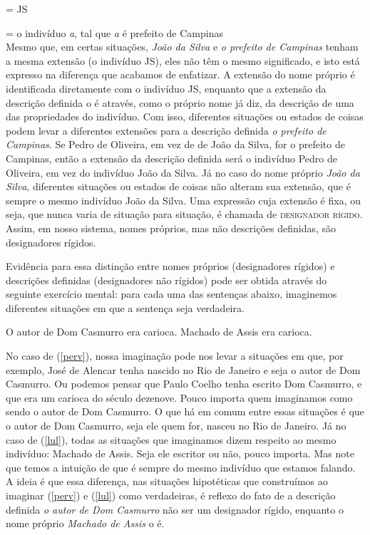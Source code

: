 \n {} = JS

\n {} = o indivíduo \textit{a}, tal
que \textit{a} é prefeito de Campinas\\

\n Mesmo que, em certas situações, \textit{João da Silva} e \textit{o prefeito de Campinas} tenham a mesma extensão (o indivíduo JS), eles não têm o
mesmo significado, e isto está expresso na diferença que acabamos
de enfatizar. A extensão do nome próprio é identificada
diretamente com o indivíduo JS, enquanto que a extensão da
descrição definida o é através, como o próprio nome já diz, da
descrição de uma das propriedades do indivíduo. Com isso,
diferentes situações ou estados de coisas podem levar a diferentes
extensões para a descrição definida \textit{o prefeito de Campinas}. Se
Pedro de Oliveira, em vez de de João da Silva, for o prefeito de
Campinas, então a extensão da descrição definida será o indivíduo
Pedro de Oliveira, em vez do indivíduo João da Silva. Já no caso
do nome próprio \textit{João da Silva}, diferentes situações ou estados
de coisas não alteram sua extensão, que é sempre o mesmo indivíduo
João da Silva. Uma expressão cuja extensão é fixa, ou seja, que
nunca varia de situação para situação, é chamada de
\textsc{designador rígido}. Assim, em nosso sistema, nomes
próprios, mas não descrições definidas, são designadores rígidos.

Evidência para essa distinção entre nomes próprios
(designadores rígidos) e descrições definidas
(designadores não rígidos) pode ser obtida através do
seguinte exercício mental: para cada uma das sentenças abaixo,
imaginemos diferentes situações em que a sentença seja verdadeira.

\begin{exe}
\ex O autor de Dom Casmurro era carioca.\label{perv}
\ex Machado de Assis era carioca.\label{lul}
\end{exe}

No caso de (\ref{perv}), nossa imaginação pode nos levar a
situações em que, por exemplo, José de Alencar tenha nascido no
Rio de Janeiro e seja o autor de Dom Casmurro. Ou podemos pensar
que Paulo Coelho tenha escrito Dom Casmurro, e que era um carioca
do século dezenove. Pouco importa quem imaginamos como sendo o
autor de Dom Casmurro. O que há em comum entre essas situações é
que o autor de Dom Casmurro, seja ele quem for, nasceu no Rio de
Janeiro. Já no caso de (\ref{lul}), todas as situações que
imaginamos dizem respeito ao mesmo indivíduo: Machado de Assis.
Seja ele escritor ou não, pouco importa. Mas note que temos a
intuição de que é sempre do mesmo indivíduo que estamos falando. A
ideia é que essa diferença, nas situações hipotéticas que
construímos ao imaginar (\ref{perv}) e (\ref{lul}) como verdadeiras,
é reflexo do fato de a descrição definida \textit{o autor de Dom
Casmurro} não ser um designador rígido, enquanto o nome
próprio \textit{Machado de Assis} o é.

